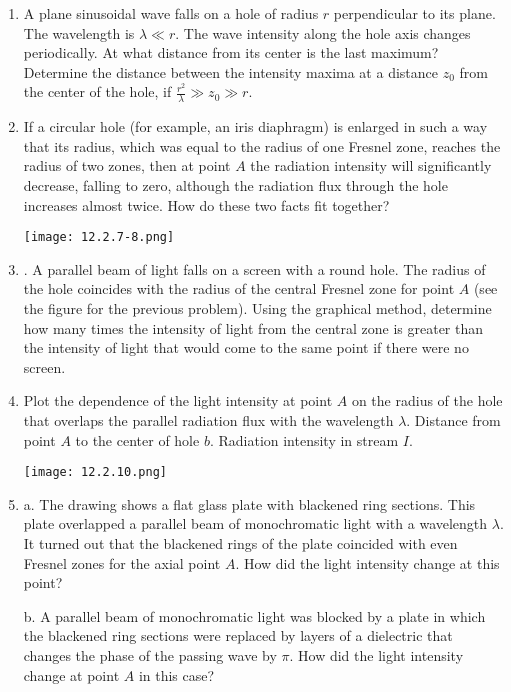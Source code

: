 \documentclass{article}
\begin{document}
\begin{enumerate}[label=12.2.\arabic*]
\item A plane sinusoidal wave falls on a hole of radius $r$ perpendicular to its plane. The wavelength is $\lambda \ll r$. The wave intensity along the hole axis changes periodically. At what distance from its center is the last maximum? Determine the distance between the intensity maxima at a distance $z_0$ from the center of the hole, if $\frac{r^2}{\lambda} \gg z_0 \gg r$.

\item If a circular hole (for example, an iris diaphragm) is enlarged in such a way that its radius, which was equal to the radius of one Fresnel zone, reaches the radius of two zones, then at point $A$ the radiation intensity will significantly decrease, falling to zero, although the radiation flux through the hole increases almost twice. How do these two facts fit together?

\begin{center}
    \texttt{[image: 12.2.7-8.png]}
\end{center}


\item. A parallel beam of light falls on a screen with a round hole. The radius of the hole coincides with the radius of the central Fresnel zone for point $A$ (see the figure for the previous problem). Using the graphical method, determine how many times the intensity of light from the central zone is greater than the intensity of light that would come to the same point if there were no screen.

\item Plot the dependence of the light intensity at point $A$ on the radius of the hole that overlaps the parallel radiation flux with the wavelength $\lambda$. Distance from point $A$ to the center of hole $b$. Radiation intensity in stream $I$.

\begin{center}
    \texttt{[image: 12.2.10.png]}
\end{center}


\item a. The drawing shows a flat glass plate with blackened ring sections. This plate overlapped a parallel beam of monochromatic light with a wavelength $\lambda$. It turned out that the blackened rings of the plate coincided with even Fresnel zones for the axial point $A$. How did the light intensity change at this point? 

b. A parallel beam of monochromatic light was blocked by a plate in which the blackened ring sections were replaced by layers of a dielectric that changes the phase of the passing wave by $\pi$. How did the light intensity change at point $A$ in this case?


\end{enumerate}
\end{document}
